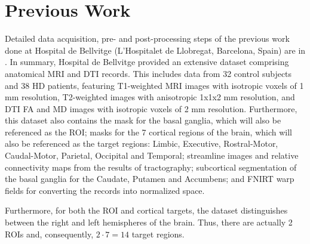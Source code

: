 \section{Previous Work}

Detailed data acquisition, pre- and post-processing steps of the previous work done at Hospital de Bellvitge (L'Hospitalet de Llobregat, Barcelona, Spain) are in . In summary, Hospital de Bellvitge provided an extensive dataset comprising anatomical \ac{MRI} and \ac{DTI} records. This includes data from 32 control subjects and 38 \ac{HD} patients, featuring T1-weighted \ac{MRI} images with isotropic voxels of 1 mm resolution, T2-weighted images with anisotropic 1x1x2 mm resolution, and \ac{DTI} \ac{FA} and \ac{MD} images with isotropic voxels of 2 mm resolution. Furthermore, this dataset also contains the mask for the basal ganglia, which will also be referenced as the \ac{ROI}; masks for the 7 cortical regions of the brain, which will also be referenced as the target regions: Limbic, Executive, Rostral-Motor, Caudal-Motor, Parietal, Occipital and Temporal; streamline images and relative connectivity maps from the results of tractography; subcortical segmentation of the basal ganglia for the Caudate, Putamen and Accumbens; and \ac{FNIRT} warp fields for converting the records into normalized space.\par
Furthermore, for both the \ac{ROI} and cortical targets, the dataset distinguishes between the right and left hemispheres of the brain. Thus, there are actually 2 \ac{ROI}s and, consequently, $2 \cdot 7=14$ target regions.


